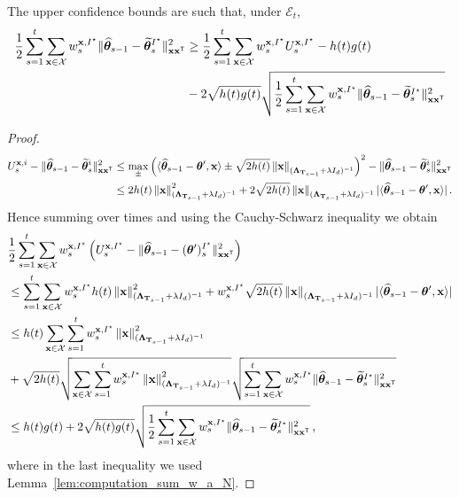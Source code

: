 \begin{lemma}
The upper confidence bounds are such that, under $\mathcal E_t$,
\begin{align*}
    \frac{1}{2}\sum_{s=1}^t \sum_{{\bf x}\in\mathcal{X}} w_s^{{\bf x},I^\star}\Vert \widehat{{\boldsymbol \theta}}_{s-1} - \widetilde{{\boldsymbol \theta}}_s^{I^\star}\Vert_{{\bf x}{\bf x}^\mathsf{\scriptscriptstyle T}}^2\label{eq:only_istar}
    &\ge \frac{1}{2}\sum_{s=1}^t\sum_{{\bf x}\in\mathcal{X}} w_s^{{\bf x},I^\star}U_s^{{\bf x},I^\star} - h(t)g(t)\\ 
    &-2\sqrt{ h(t) g(t)}  \sqrt{\frac{1}{2}\sum_{s=1}^t \sum_{{\bf x}\in\mathcal{X}} w_s^{{\bf x},I^\star}\Vert \widehat{{\boldsymbol \theta}}_{s-1} - \widetilde{{\boldsymbol \theta}}_s^{I^\star} \Vert_{{\bf x}{\bf x}^\mathsf{\scriptscriptstyle T}}^2}
\end{align*}
\end{lemma}
\begin{proof}
\begin{align*}
U_s^{{\bf x},i} -\Vert \widehat{{\boldsymbol \theta}}_{s-1} - \widetilde{{\boldsymbol \theta}}_s^i\Vert_{{\bf x}{\bf x}^\mathsf{\scriptscriptstyle T}}^2
&\leq   \max_\pm \left( \langle \widehat{{\boldsymbol \theta}}_{s-1} - {\boldsymbol \theta}',{\bf x}\rangle \pm \sqrt{2 h(t)} \left\lVert{\bf x}\right\rVert_{({\boldsymbol \Lambda}_{{\bf T}_{s-1}}+ \lambda I_d)^{-1}} \right)^2-\Vert \widehat{{\boldsymbol \theta}}_{s-1} - \widetilde{{\boldsymbol \theta}}_s^i\Vert_{{\bf x}{\bf x}^\mathsf{\scriptscriptstyle T}}^2\\
&\leq  2h(t)\left\lVert{\bf x}\right\rVert^2_{({\boldsymbol \Lambda}_{{\bf T}_{s-1}}+ \lambda I_d)^{-1}} + 2\sqrt{2 h(t)} \left\lVert{\bf x}\right\rVert_{({\boldsymbol \Lambda}_{{\bf T}_{s-1}}+ \lambda I_d)^{-1}}| \langle \widehat{{\boldsymbol \theta}}_{s-1} - {\boldsymbol \theta}',{\bf x}\rangle|\,.\\
\end{align*}
Hence summing over times and using the Cauchy-Schwarz inequality we obtain
\begin{align*}
&\frac{1}{2}\sum_{s=1}^t\sum_{{\bf x}\in\mathcal{X}} w_s^{{\bf x},I^\star}\left(U_s^{{\bf x},I^\star} -\Vert \widehat{{\boldsymbol \theta}}_{s-1} - ({\boldsymbol \theta}')_s^{I^\star}\Vert_{{\bf x}{\bf x}^\mathsf{\scriptscriptstyle T}}^2\right)
\\
&\le \sum_{s=1}^t \sum_{{\bf x}\in\mathcal{X}} w_s^{{\bf x},I^\star}h(t)\left\lVert{\bf x}\right\rVert^2_{({\boldsymbol \Lambda}_{{\bf T}_{s-1}}+ \lambda I_d)^{-1}} +w_s^{{\bf x},I^\star} \sqrt{2 h(t)} \left\lVert{\bf x}\right\rVert_{({\boldsymbol \Lambda}_{{\bf T}_{s-1}}+ \lambda I_d)^{-1}}| \langle \widehat{{\boldsymbol \theta}}_{s-1} - {\boldsymbol \theta}',{\bf x}\rangle|
\\
&\le  h(t) \sum_{{\bf x}\in\mathcal{X}} \sum_{s=1}^t w_s^{{\bf x},I^\star}\left\lVert{\bf x}\right\rVert^2_{({\boldsymbol \Lambda}_{{\bf T}_{s-1}}+ \lambda I_d)^{-1}}\\
&+ \sqrt{2 h(t)} \sqrt{\sum_{{\bf x}\in\mathcal{X}} \sum_{s=1}^t w_s^{{\bf x},I^\star}\left\lVert{\bf x}\right\rVert^2_{({\boldsymbol \Lambda}_{{\bf T}_{s-1}}+ \lambda I_d)^{-1}}}  \sqrt{\sum_{s=1}^t \sum_{{\bf x}\in\mathcal{X}} w_s^{{\bf x},I^\star}\Vert \widehat{{\boldsymbol \theta}}_{s-1} - \widetilde{{\boldsymbol \theta}}_s^{I^\star} \Vert_{{\bf x}{\bf x}^\mathsf{\scriptscriptstyle T}}^2} \\
&\leq h(t)g(t) +2\sqrt{ h(t) g(t)}  \sqrt{\frac{1}{2}\sum_{s=1}^t \sum_{{\bf x}\in\mathcal{X}} w_s^{{\bf x},I^\star}\Vert \widehat{{\boldsymbol \theta}}_{s-1} - \widetilde{{\boldsymbol \theta}}_s^{I^\star} \Vert_{{\bf x}{\bf x}^\mathsf{\scriptscriptstyle T}}^2}\,,
\end{align*}
where in the last inequality we used Lemma~\ref{lem:computation_sum_w_a_N}.
\end{proof}

